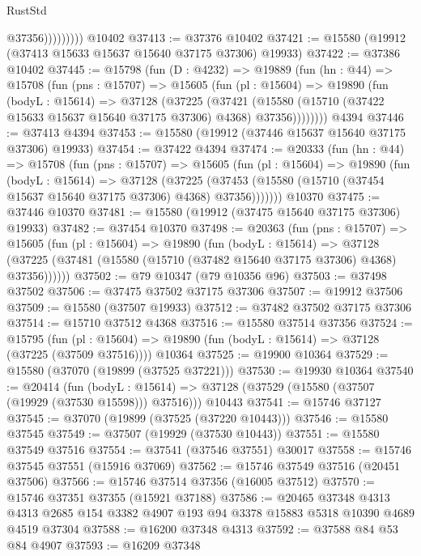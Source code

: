 \begin{lexlean}{RustStd}
\begin{coremodule}
                      @37356)))))))))
    @10402
@37413 := @37376 @10402
@37421 := @15580 (@19912 (@37413 @15633 @15637 @15640 @37175 @37306) @19933)
@37422 := @37386 @10402
@37445 := @15798
    (fun (D : @4232) =>
    @19889
      (fun (hn : @44) =>
      @15708
        (fun (pns : @15707) =>
        @15605
          (fun (pl : @15604) =>
          @19890
            (fun (bodyL : @15614) =>
            @37128
              (@37225
                (@37421
                  (@15580 (@15710 (@37422 @15633 @15637 @15640 @37175 @37306) @4368) @37356))))))))
    @4394
@37446 := @37413 @4394
@37453 := @15580 (@19912 (@37446 @15637 @15640 @37175 @37306) @19933)
@37454 := @37422 @4394
@37474 := @20333
    (fun (hn : @44) =>
    @15708
      (fun (pns : @15707) =>
      @15605
        (fun (pl : @15604) =>
        @19890
          (fun (bodyL : @15614) =>
          @37128
            (@37225
              (@37453 (@15580 (@15710 (@37454 @15637 @15640 @37175 @37306) @4368) @37356)))))))
    @10370
@37475 := @37446 @10370
@37481 := @15580 (@19912 (@37475 @15640 @37175 @37306) @19933)
@37482 := @37454 @10370
@37498 := @20363
    (fun (pns : @15707) =>
    @15605
      (fun (pl : @15604) =>
      @19890
        (fun (bodyL : @15614) =>
        @37128 (@37225 (@37481 (@15580 (@15710 (@37482 @15640 @37175 @37306) @4368) @37356))))))
@37502 := @79 @10347 (@79 @10356 @96)
@37503 := @37498 @37502
@37506 := @37475 @37502 @37175 @37306
@37507 := @19912 @37506
@37509 := @15580 (@37507 @19933)
@37512 := @37482 @37502 @37175 @37306
@37514 := @15710 @37512 @4368
@37516 := @15580 @37514 @37356
@37524 := @15795
    (fun (pl : @15604) => @19890 (fun (bodyL : @15614) => @37128 (@37225 (@37509 @37516))))
    @10364
@37525 := @19900 @10364
@37529 := @15580 (@37070 (@19899 (@37525 @37221)))
@37530 := @19930 @10364
@37540 := @20414
    (fun (bodyL : @15614) => @37128 (@37529 (@15580 (@37507 (@19929 (@37530 @15598))) @37516)))
    @10443
@37541 := @15746 @37127
@37545 := @37070 (@19899 (@37525 (@37220 @10443)))
@37546 := @15580 @37545
@37549 := @37507 (@19929 (@37530 @10443))
@37551 := @15580 @37549 @37516
@37554 := @37541 (@37546 @37551) @30017
@37558 := @15746 @37545 @37551 (@15916 @37069)
@37562 := @15746 @37549 @37516 (@20451 @37506)
@37566 := @15746 @37514 @37356 (@16005 @37512)
@37570 := @15746 @37351 @37355 (@15921 @37188)
@37586 := @20465
    @37348
    @4313
    @4313
    @2685
    @154
    @3382
    @4907
    @193
    @94
    @3378
    @15883
    @5318
    @10390
    @4689
    @4519
    @37304
@37588 := @16200 @37348 @4313
@37592 := @37588 @84 @53 @84 @4907
@37593 := @16209 @37348

\end{coremodule}
\end{lexlean}
